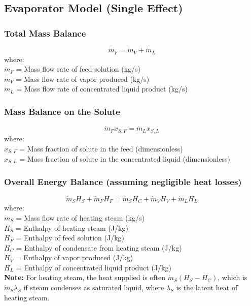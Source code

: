 \subsection{Evaporator Model (Single Effect)}
\subsubsection*{Total Mass Balance}
\begin{equation}
    \dot{m}_F = \dot{m}_V + \dot{m}_L
\end{equation}
where: \\
$\dot{m}_F$ = Mass flow rate of feed solution (kg/s) \\
$\dot{m}_V$ = Mass flow rate of vapor produced (kg/s) \\
$\dot{m}_L$ = Mass flow rate of concentrated liquid product (kg/s)

\subsubsection*{Mass Balance on the Solute}
\begin{equation}
    \dot{m}_F x_{S,F} = \dot{m}_L x_{S,L}
\end{equation}
where: \\
$x_{S,F}$ = Mass fraction of solute in the feed (dimensionless) \\
$x_{S,L}$ = Mass fraction of solute in the concentrated liquid (dimensionless)

\subsubsection*{Overall Energy Balance (assuming negligible heat losses)}
\begin{equation}
    \dot{m}_S H_S + \dot{m}_F H_F = \dot{m}_S H_C + \dot{m}_V H_V + \dot{m}_L H_L
\end{equation}
where: \\
$\dot{m}_S$ = Mass flow rate of heating steam (kg/s) \\
$H_S$ = Enthalpy of heating steam (J/kg) \\
$H_F$ = Enthalpy of feed solution (J/kg) \\
$H_C$ = Enthalpy of condensate from heating steam (J/kg) \\
$H_V$ = Enthalpy of vapor produced (J/kg) \\
$H_L$ = Enthalpy of concentrated liquid product (J/kg) \\
\quad \textbf{Note:} For heating steam, the heat supplied is often $\dot{m}_S (H_S - H_C)$, which is $\dot{m}_S \lambda_S$ if steam condenses as saturated liquid, where $\lambda_S$ is the latent heat of heating steam.

